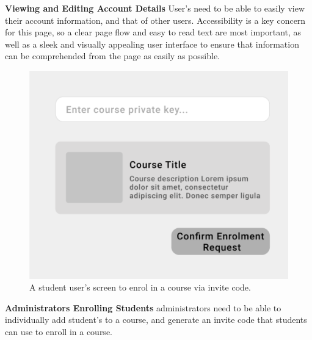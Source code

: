 \textbf{Viewing and Editing Account Details}
User's need to be able to easily view their account information, and that of other users. Accessibility is a key concern for this page, so a clear page flow and easy to read text are most important, as well as a sleek and visually appealing user interface to ensure that information can be comprehended from the page as easily as possible.

\begin{figure}[h!]
  \centering
  \includegraphics[scale=0.2]{images/accounts-code}
  \caption{A student user's screen to enrol in a course via invite code.}
\end{figure}

\textbf{Administrators Enrolling Students}
administrators need to be able to individually add student's to a course, and generate an invite code that students can use to enroll in a course. 

